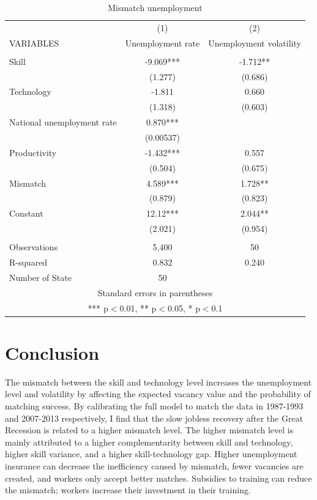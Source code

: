 \documentclass[12pt]{article}
\newcommand{\1}{\mathbb{1}}
\begin{document}
\begin{table}[h!]
\scriptsize
\begin{center}
\begin{tabular}{lcc} \hline \hline
 & (1) & (2) \\
VARIABLES & Unemployment rate & Unemployment volatility \\ \hline
 &  &  \\
Skill & -9.069*** & -1.712** \\
 & (1.277) & (0.686) \\
Technology & -1.811 & 0.660 \\
 & (1.318) & (0.603) \\
National unemployment rate & 0.870*** &  \\
 & (0.00537) &  \\
Productivity & -1.432*** & 0.557 \\
 & (0.504) & (0.675) \\
Mismatch & 4.589*** & 1.728** \\
 & (0.879) & (0.823) \\
Constant & 12.12*** & 2.044** \\
 & (2.021) & (0.954) \\
 &  &  \\
Observations & 5,400 & 50 \\
R-squared & 0.832 & 0.240 \\
 Number of State & 50 &  \\ \hline
\multicolumn{3}{c}{ Standard errors in parentheses} \\
\multicolumn{3}{c}{ *** p$<$0.01, ** p$<$0.05, * p$<$0.1} \\
\end{tabular}
\end{center}
\caption{Mismatch unemployment}
\label{unemployment}
\end{table}

\clearpage
\section{Conclusion}
The mismatch between the skill and technology level increases the unemployment level and volatility by affecting the expected vacancy value and the probability of matching success. By calibrating the full model to match the data in 1987-1993 and 2007-2013 respectively, I find that the slow jobless recovery after the Great Recession is related to a higher mismatch level. The higher mismatch level is mainly attributed to a higher complementarity between skill and technology, higher skill variance, and a higher skill-technology gap. Higher unemployment insurance can decrease the inefficiency caused by mismatch, fewer vacancies are created, and workers only accept better matches. Subsidies to training can reduce the mismatch; workers increase their investment in their training. 

\clearpage


\end{document}
